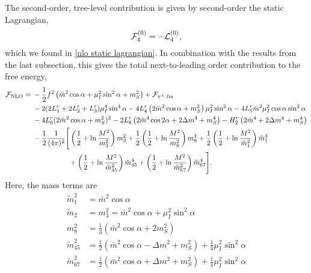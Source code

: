 The second-order, tree-level contribution is given by second-order the static Lagrangian,
%
\begin{equation}
    \mathcal{F}^{(0)}_4 = - \mathcal{L}_4^{(0)},
\end{equation}
%
which we found in \autoref{nlo static lagrangian}.
In combination with the results from the last subsection, this gives the total next-to-leading order contribution to the free energy,
%
\begin{align}
    \nonumber
    \mathcal{F}_{\text{NLO}}
    ={}&
    -\frac{1}{2} f^2 \left(\bar m^2 \cos\alpha + \mu_I^2 \sin^2\alpha + m_S^2\right)
    + \mathcal{F}_{{\pi^\pm},\text{fin}} \\ \nonumber
    &-2(2L_1^r + 2L_2^r + L_3^r) \mu_I^4 \sin^4\alpha
    - 4  L_4^r \left( 2 \bar m^2 \cos\alpha + m_S^2 \right) \mu_I^2\sin^2\alpha
    - 4 L_5^r \bar m^2 \mu_I^2 \cos\alpha \sin^2 \alpha 
    \\ \nonumber
    & 
    - 4 L_6^r (2\bar m^2\cos\alpha + m_S^2)^2
    - 2 L_8^r \left(2 \bar m^4 \cos2\alpha + 2 \Delta m^4 + m_S^4\right)
    - H_2^r \left(2\bar m^4 + 2\Delta m^4 + m_S^4 \right) \\\nonumber
    & - \frac{1}{2} \frac{1}{(4 \pi)^2}  
    \Bigg[
        \left(
            \frac{1}{2} + \ln\frac{M^2}{m_3^2}
        \right)
        m_3^2
        + 
        \frac{1}{2}
        \left(
            \frac{1}{2} + \ln\frac{M^2}{m_8^2} 
        \right)
        m_8^4
        +
        \frac{1}{2}
        \left(
            \frac{1}{2} + \ln\frac{M^2}{\tilde m_1^2}
        \right)
        \tilde m_1^4
        \\
        & 
        \quad\quad\quad\quad\quad
        +
        \left(
            \frac{1}{2} + \ln\frac{M^2}{\tilde m_{45}^2}
        \right)
        \tilde m_{45}^4
        +
        \left(
            \frac{1}{2} + \ln\frac{M^2}{\tilde m_{67}^2} 
        \right)
        \tilde m_{67}^4
    \Bigg].
\end{align}
%
Here, the mass terms are
%
\begin{align}
    \tilde m_1^2 
    & =
    \bar m^2 \cos\alpha \\
    \tilde m_2 &= m_3^2 = \bar m^2 \cos\alpha + \mu_I^2 \sin^2\alpha \\
    m_8^2 & = \frac{1}{3} (\bar m^2 \cos\alpha + 2m_S^2) \\
    \tilde m_{45}^2 & 
    = \frac{1}{2}(\bar m^2 \cos \alpha - \Delta m^2 + m_S^2)
    + \frac{1}{4} \mu_I^2\sin^2\alpha \\
    \tilde m_{67}^2 & 
    = \frac{1}{2}(\bar m^2 \cos \alpha + \Delta m^2 + m_S^2)
    + \frac{1}{4} \mu_I^2\sin^2\alpha
\end{align}


